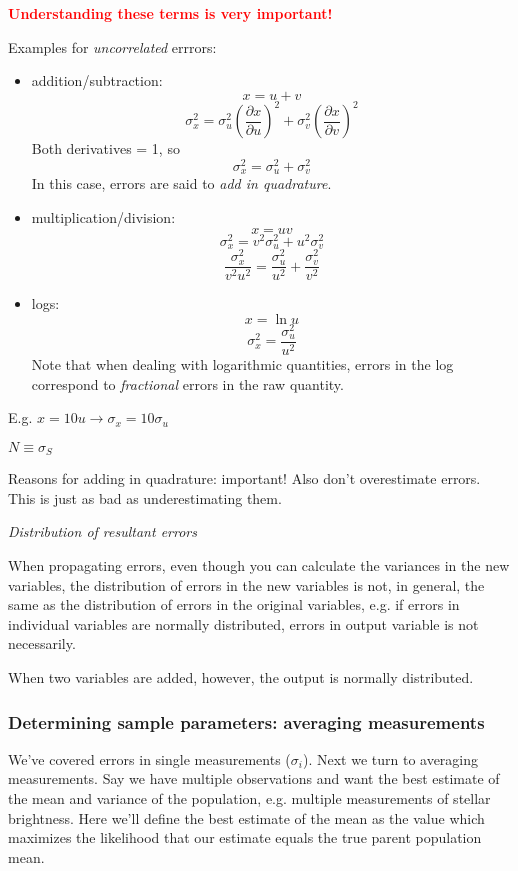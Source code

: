 \documentclass[12pt]{article}
\begin{document}
\textcolor{red}{\textbf{Understanding these terms is very important!}}

Examples for \emph{uncorrelated} errrors:
\begin{itemize}
    \item addition/subtraction:
        $$ x = u + v $$
        $$ \sigma_x^2 = \sigma_u^2\left(\frac{\partial x}
        {\partial u}\right)^2
        + \sigma_v^2\left(\frac{\partial x}{\partial v}\right)^2 $$
        Both derivatives = 1, so
        $$ \sigma_x^2 = \sigma_u^2 + \sigma_v^2 $$
        In this case, errors are said to \emph{add in quadrature}.
    \item multiplication/division:
        $$ x = uv $$
        $$ \sigma_x^2 = v^2\sigma_u^2 + u^2\sigma_v^2 $$
        $$ \frac{\sigma_x^2}{v^2u^2} =
        \frac{\sigma_u^2}{u^2} + \frac{\sigma_v^2}{v^2}$$
    \item logs:
        $$ x = \ln u $$
        $$ \sigma_x^2 = \frac{\sigma_u^2}{u^2} $$
        Note that when dealing with logarithmic quantities, errors in
        the log correspond to \emph{fractional} errors in the raw
        quantity.
\end{itemize}

\textcolor{myBlue}{E.g. $x=10u \rightarrow \sigma_x=10\sigma_u$}

\textcolor{myBlue}{$N \equiv \sigma_S$}

\textcolor{myBlue}{Reasons for adding in quadrature: important!
Also don't overestimate errors. This is just as bad as
underestimating them.}

\emph{Distribution of resultant errors}

When propagating errors, even though you can calculate the variances
in the new variables, the distribution of errors in the new variables
is not, in general, the same as the distribution of errors in the
original variables, e.g. if errors in individual variables are
normally distributed, errors in output variable is not necessarily.

When two variables are added, however, the output is normally
distributed.

\subsubsection*{Determining sample parameters: averaging measurements}
We've covered errors in single measurements ($\sigma_i$).
Next we turn to averaging measurements.
Say we have multiple observations and want the best
estimate of the mean and variance of the population, e.g. multiple
measurements of stellar brightness. Here we'll define the best
estimate of the mean as the value which maximizes the likelihood that
our estimate equals the true parent population mean.
\end{document}
